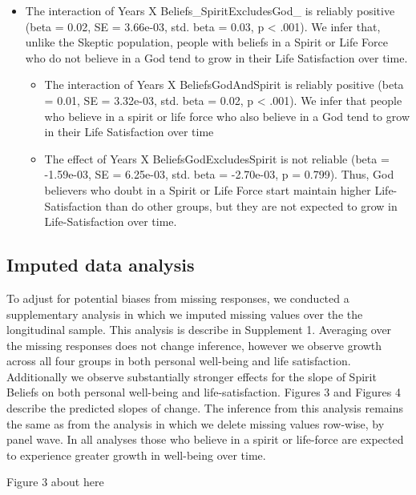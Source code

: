 \documentclass[
  english,
  man]{apa6}
\providecommand{\tightlist}{%
  \setlength{\itemsep}{0pt}\setlength{\parskip}{0pt}}
\begin{document}
\begin{itemize}
\tightlist
\item
  The interaction of Years X Beliefs\_SpiritExcludesGod\_ is reliably positive (beta = 0.02, SE = 3.66e-03, std. beta = 0.03, p \textless{} .001). We infer that, unlike the Skeptic population, people with beliefs in a Spirit or Life Force who do not believe in a God tend to grow in their Life Satisfaction over time.

  \begin{itemize}
  \tightlist
  \item
    The interaction of Years X BeliefsGodAndSpirit is reliably positive (beta = 0.01, SE = 3.32e-03, std. beta = 0.02, p \textless{} .001). We infer that people who believe in a spirit or life force who also believe in a God tend to grow in their Life Satisfaction over time
  \item
    The effect of Years X BeliefsGodExcludesSpirit is not reliable (beta = -1.59e-03, SE = 6.25e-03, std. beta = -2.70e-03, p = 0.799). Thus, God believers who doubt in a Spirit or Life Force start maintain higher Life-Satisfaction than do other groups, but they are not expected to grow in Life-Satisfaction over time.
  \end{itemize}
\end{itemize}

\hypertarget{imputed-data-analysis}{%
\subsection{Imputed data analysis}\label{imputed-data-analysis}}

To adjust for potential biases from missing responses, we conducted a supplementary analysis in which we imputed missing values over the the longitudinal sample. This analysis is describe in Supplement 1. Averaging over the missing responses does not change inference, however we observe growth across all four groups in both personal well-being and life satisfaction. Additionally we observe substantially stronger effects for the slope of Spirit Beliefs on both personal well-being and life-satisfaction. Figures 3 and Figures 4 describe the predicted slopes of change. The inference from this analysis remains the same as from the analysis in which we delete missing values row-wise, by panel wave. In all analyses those who believe in a spirit or life-force are expected to experience greater growth in well-being over time.

Figure 3 about here
\end{document}
